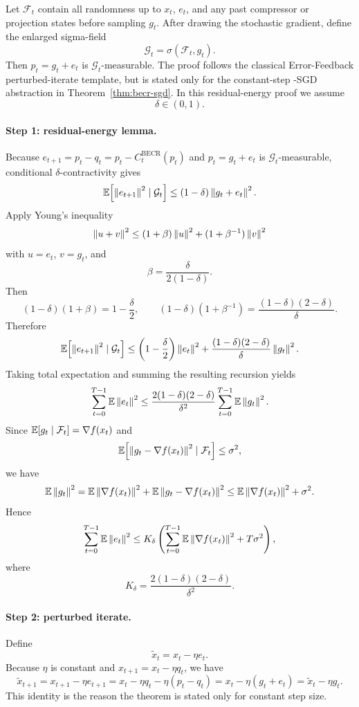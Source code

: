 Let $\mathcal F_t$ contain all randomness up to $x_t$, $e_t$, and any past
compressor or projection states before sampling $g_t$. After drawing the
stochastic gradient, define the enlarged sigma-field
\[
\mathcal G_t=\sigma(\mathcal F_t,g_t).
\]
Then $p_t=g_t+e_t$ is $\mathcal G_t$-measurable. The proof follows the
classical Error-Feedback perturbed-iterate template, but is stated only for
the constant-step \BECR-SGD abstraction in
Theorem~\ref{thm:becr-sgd}. In this residual-energy proof we assume
\[
\delta\in(0,1).
\]

\paragraph{Step 1: residual-energy lemma.}
Because $e_{t+1}=p_t-q_t=p_t-C_t^{\mathrm{BECR}}(p_t)$ and
$p_t=g_t+e_t$ is $\mathcal G_t$-measurable, conditional $\delta$-contractivity
gives
\[
\mathbb{E}\!\left[\left\lVert e_{t+1} \right\rVert^2\mid \mathcal G_t\right]
\le
(1-\delta)\left\lVert g_t+e_t \right\rVert^2.
\]
Apply Young's inequality
\[
\left\lVert u+v \right\rVert^2\le (1+\beta)\left\lVert u \right\rVert^2+(1+\beta^{-1})\left\lVert v \right\rVert^2
\]
with $u=e_t$, $v=g_t$, and
\[
\beta=\frac{\delta}{2(1-\delta)}.
\]
Then
\[
(1-\delta)(1+\beta)=1-\frac{\delta}{2},
\qquad
(1-\delta)(1+\beta^{-1})
=
\frac{(1-\delta)(2-\delta)}{\delta}.
\]
Therefore
\[
\mathbb{E}\!\left[\left\lVert e_{t+1} \right\rVert^2\mid \mathcal G_t\right]
\le
\left(1-\frac{\delta}{2}\right)\left\lVert e_t \right\rVert^2
+
\frac{(1-\delta)(2-\delta)}{\delta}\left\lVert g_t \right\rVert^2.
\]
Taking total expectation and summing the resulting recursion yields
\[
\sum_{t=0}^{T-1}\mathbb{E}\left\lVert e_t \right\rVert^2
\le
\frac{2(1-\delta)(2-\delta)}{\delta^2}
\sum_{t=0}^{T-1}\mathbb{E}\left\lVert g_t \right\rVert^2.
\]
Since $\mathbb{E}[g_t\mid\mathcal F_t]=\nabla f(x_t)$ and
\[
\mathbb{E}\!\left[\left\lVert g_t-\nabla f(x_t) \right\rVert^2\mid\mathcal F_t\right]\le \sigma^2,
\]
we have
\[
\mathbb{E}\left\lVert g_t \right\rVert^2
=
\mathbb{E}\left\lVert \nabla f(x_t) \right\rVert^2
+
\mathbb{E}\left\lVert g_t-\nabla f(x_t) \right\rVert^2
\le
\mathbb{E}\left\lVert \nabla f(x_t) \right\rVert^2+\sigma^2.
\]
Hence
\[
\sum_{t=0}^{T-1}\mathbb{E}\left\lVert e_t \right\rVert^2
\le
K_\delta
\left(
\sum_{t=0}^{T-1}\mathbb{E}\left\lVert \nabla f(x_t) \right\rVert^2
+
T\sigma^2
\right),
\]
where
\[
K_\delta=\frac{2(1-\delta)(2-\delta)}{\delta^2}.
\]

\paragraph{Step 2: perturbed iterate.}
Define
\[
\tilde x_t=x_t-\eta e_t.
\]
Because $\eta$ is constant and $x_{t+1}=x_t-\eta q_t$, we have
\[
\tilde x_{t+1}
=
x_{t+1}-\eta e_{t+1}
=
x_t-\eta q_t-\eta(p_t-q_t)
=
x_t-\eta(g_t+e_t)
=
\tilde x_t-\eta g_t.
\]
This identity is the reason the theorem is stated only for constant step size.

